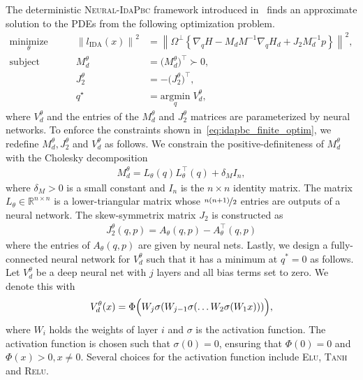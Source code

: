 The deterministic \textsc{Neural-IdaPbc} framework introduced
in~\cite{neuralidapbc} finds an approximate solution to the PDEs from the
following optimization problem.
\begin{equation}
  \begin{aligned}
      \underset{\theta }{\textrm{minimize}} 
      &&\quad \left\| l_{\textrm{IDA}} (x) \right\|^2 &= \left\| \Omega^\perp \left\{ \nabla_qH - M_dM^{-1} \nabla_qH_d + J_2M_d^{-1}p \right\} \right\|^2, \\
      \textrm{subject to} 
      &&\quad M_d^\theta &= \big( M_d^\theta \big)^\top \succ 0, \\
      &&\quad J_2^\theta &= -\big( J_2^\theta \big)^\top, \\
      &&\quad q^\star &= \underset{q}{\textrm{argmin}}\; V_d^\theta,
  \end{aligned}    
  \label{eq:idapbc_finite_optim}%
\end{equation}
where $V^\theta_d$ and the entries of the $M^\theta_d$ and $J^\theta_2$ matrices
are parameterized by neural networks. 
%
To enforce the constraints shown in~\eqref{eq:idapbc_finite_optim}, we redefine
$M^\theta_d, J^\theta_2$ and $V^\theta_d$ as follows.
%
We constrain the positive-definiteness of $M^\theta_d$ with the Cholesky
decomposition 
\begin{align*}
  M^\theta_d = L_{\theta}(q)L_{\theta}^\top(q) + \delta_M I_n,
\end{align*}
\noindent where $\delta_M > 0$ is a small constant and $I_n$ is the $n \times n$
identity matrix.
%
The matrix $L_{\theta} \in \mathbb{R}^{n \times n}$ is a lower-triangular matrix
whose $\nicefrac{n(n+1)}{2}$ entries are outputs of a neural network. 
%
The skew-symmetrix matrix $J_2$ is constructed as 
\begin{align*}
  J_2^\theta(q, p) = A_\theta(q, p) - A^\top_\theta(q, p)
\end{align*}
\noindent where the entries of $A_{\theta}(q, p)$ are given by neural nets.
%
Lastly, we design a fully-connected neural network for $V^\theta_d$ such that it
has a minimum at $q^*=0$ as follows.
%
Let $V^\theta_d$ be a deep neural net with $j$ layers and all bias terms set to
zero. We denote this with
\begin{equation}
  V_d^\theta(x) = \Phi \Bigl( W_j\sigma(W_{j-1}\sigma(\ldots W_2\sigma(W_1x))) \Bigr),
  \label{eq:Vdnet_constraint}
\end{equation}
\noindent where $W_i$ holds the weights of layer $i$ and $\sigma$ is the activation function.
%
The activation function is chosen such that $\sigma(0) = 0$, ensuring that
$\Phi(0) = 0$ and $\Phi(x) > 0, x \ne 0$.
%
Several choices for the activation function include \textsc{Elu}, \textsc{Tanh} and \textsc{Relu}.
%


